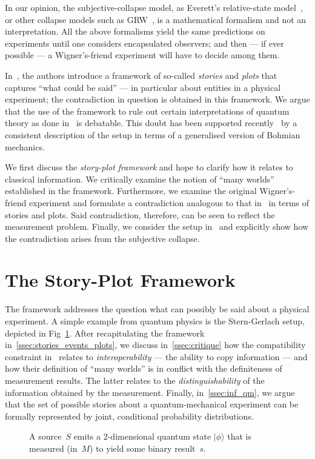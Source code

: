 \documentclass[aps,pra,twocolumn]{revtex4-1}
\newcommand{\ket}[1]{|#1 \rangle}
\theoremstyle{definition}
\theoremstyle{remark}
\begin{document}
In our opinion, the subjective-collapse model, as Everett's relative-state model~\cite{everett1957relative}, or other collapse models such as GRW~\cite{GRW85}, is a mathematical formalism and not an interpretation.
All the above formalisms yield the same predictions on experiments until one considers encapsulated observers; and then --- if ever possible --- a Wigner's-friend experiment will have to decide among them.

In~\cite{FrRen}, the authors introduce a framework of so-called \emph{stories} and \emph{plots} that captures ``what could be said'' --- in particular about entities in a physical experiment;
the contradiction in question is obtained in this framework.
We argue that the use of the framework to rule out certain interpretations of quantum theory as done in~\cite{FrRen} is debatable.
This doubt has been supported recently~\cite{sudbery2016single} by a consistent description of the setup in terms of a generalised version of Bohmian mechanics. 

We first discuss the \emph{story-plot framework} and hope to clarify how it relates to classical information. 
We critically examine the notion of ``many worlds'' established in the framework.
Furthermore, we examine the original Wigner's-friend experiment and formulate a contradiction analogous to that in~\cite{FrRen} in terms of stories and plots.
Said contradiction, therefore, can be seen to reflect the measurement problem.
Finally, we consider the setup in~\cite{FrRen} and explicitly show how the contradiction arises from the subjective collapse.
 
\section{The Story-Plot Framework}
\noindent
The framework addresses the question what can possibly be said about a physical experiment. 
A simple example from quantum physics is the Stern-Gerlach setup, depicted in Fig~\ref{fig:Stern-Gerlach}.
After recapitulating the framework in~\ref{ssec:stories_events_plots}, we discuss in~\ref{ssec:critique} how the compatibility constraint in~\cite{FrRen} relates to \emph{interoperability} --- the ability to copy information --- and how their definition of ``many worlds'' is in conflict with the definiteness of measurement results. 
The latter relates to the \emph{distinguishability} of the information obtained by the measurement.
Finally, in~\ref{ssec:inf_qm}, we argue that the set of possible stories about a quantum-mechanical experiment can be formally represented by joint, conditional probability distributions.
\begin{figure}
\centering
{}
\caption{A source~$S$ emits a 2-dimensional quantum state $\ket{\phi}$ that is measured (in~$M$) to yield some binary result~$s$.}
\label{fig:Stern-Gerlach}
\end{figure}
\end{document}
